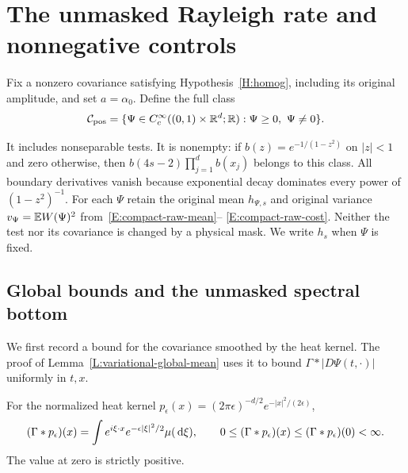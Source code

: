 \section{The unmasked Rayleigh rate and nonnegative controls}
\label{S:unmasked-variational}

Fix a nonzero covariance satisfying Hypothesis~\ref{H:homog}, including its
original amplitude, and set $a = \alpha_0$. Define the full class
\begin{equation}\label{E:variational-positive-class}
  \mathcal{C}_{\mathrm{pos}}
  =\{\Psi\in C_c^\infty((0,1)\times\mathbb{R}^d;\mathbb{R}):
  \Psi\ge0,\ \Psi\ne0\}.
\end{equation}


It includes nonseparable tests. It is nonempty: if $b(z) = e^{-1/(1-z^2)}$ on
$|z| < 1$ and zero otherwise, then $b(4s-2)\prod_{j=1}^db(x_j)$ belongs to this
class. All boundary derivatives vanish because exponential decay dominates every
power of $(1-z^2)^{-1}$. For each $\Psi$ retain the original mean $h_{\Psi,s}$
and original variance $v_\Psi = \mathbb{E} W(\Psi)^2$ from~\eqref{E:compact-raw-mean}--%
\eqref{E:compact-raw-cost}. Neither the test nor its covariance is changed by a
physical mask. We write $h_s$ when $\Psi$ is fixed.

\subsection{Global bounds and the unmasked spectral bottom}

We first record a bound for the covariance smoothed by the heat kernel. The
proof of Lemma~\ref{L:variational-global-mean} uses it to bound
$\Gamma*|D\Psi(t,\cdot)|$ uniformly in $t,x$.

\begin{lemma}
  \label{L:variational-heat-envelope}
  For the normalized heat kernel $p_\epsilon(x) =
  (2\pi\epsilon)^{-d/2}e^{-|x|^2/(2\epsilon)}$,
  \begin{equation}\label{E:variational-heat-envelope}
    (\Gamma*p_\epsilon)(x)
    =\int e^{i\xi\cdot x}e^{-\epsilon|\xi|^2/2}\mu(\,\mathrm{d}\xi),
    \qquad
    0\le(\Gamma*p_\epsilon)(x)
    \le(\Gamma*p_\epsilon)(0)<\infty.
  \end{equation}
  The value at zero is strictly positive.
\end{lemma}

